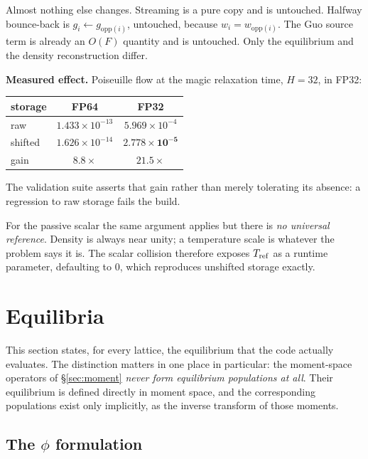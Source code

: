 \documentclass[11pt,a4paper]{article}
\begin{document}
Almost nothing else changes. Streaming is a pure copy and is untouched. Halfway
bounce-back is $g_i \leftarrow g_{\mathrm{opp}(i)}$, untouched, because
$w_i = w_{\mathrm{opp}(i)}$. The Guo source term is already an $O(F)$ quantity and
is untouched. Only the equilibrium and the density reconstruction differ.

\medskip
\noindent\textbf{Measured effect.} Poiseuille flow at the magic relaxation time,
$H=32$, in FP32:

\begin{center}\small
\begin{tabular}{lcc}
\toprule
storage & FP64 & FP32 \\
\midrule
raw     & $1.433\times10^{-13}$ & $5.969\times10^{-4}$ \\
shifted & $1.626\times10^{-14}$ & $\bm{2.778\times10^{-5}}$ \\
\midrule
gain    & $8.8\times$ & $\bm{21.5\times}$ \\
\bottomrule
\end{tabular}
\end{center}

\noindent The validation suite asserts that gain rather than merely tolerating
its absence: a regression to raw storage fails the build.

For the passive scalar the same argument applies but there is \emph{no universal
reference}. Density is always near unity; a temperature scale is whatever the
problem says it is. The scalar collision therefore exposes $T_{\rm ref}$ as a
runtime parameter, defaulting to $0$, which reproduces unshifted storage exactly.


\section{Equilibria}
\label{sec:equilibria}

This section states, for every lattice, the equilibrium that the code actually
evaluates. The distinction matters in one place in particular: the moment-space
operators of \S\ref{sec:moment} \emph{never form equilibrium populations at all}.
Their equilibrium is defined directly in moment space, and the corresponding
populations exist only implicitly, as the inverse transform of those moments.

\subsection{The $\phi$ formulation}
\label{sec:eqphi}
\end{document}
